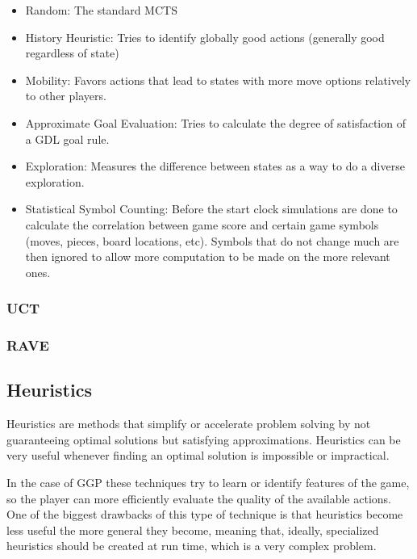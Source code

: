 \begin{itemize}

\item Random: The standard MCTS

\item History Heuristic: Tries to identify globally good actions (generally good regardless of state)

\item Mobility: Favors actions that lead to states with more move options relatively to other players.

\item Approximate Goal Evaluation: Tries to calculate the degree of satisfaction of a GDL goal rule.

\item Exploration: Measures the difference between states as a way to do a diverse exploration.

\item Statistical Symbol Counting: Before the start clock simulations are done to calculate the correlation between game score and certain game symbols (moves, pieces, board locations, etc). Symbols that do not change much are then ignored to allow more computation to be made on the more relevant ones.

\end{itemize}

\subsubsection{UCT}

\subsubsection{RAVE}

\subsection{Heuristics}
Heuristics are methods that simplify or accelerate problem solving by not guaranteeing optimal solutions but satisfying approximations. Heuristics can be very useful whenever finding an optimal solution is impossible or impractical.

In the case of \gls{GGP} these techniques try to learn or identify features of the game, so the player can more efficiently evaluate the quality of the available actions. One of the biggest drawbacks of this type of technique is that heuristics become less useful the more general they become, meaning that, ideally, specialized heuristics should be created at run time, which is a very complex problem.

